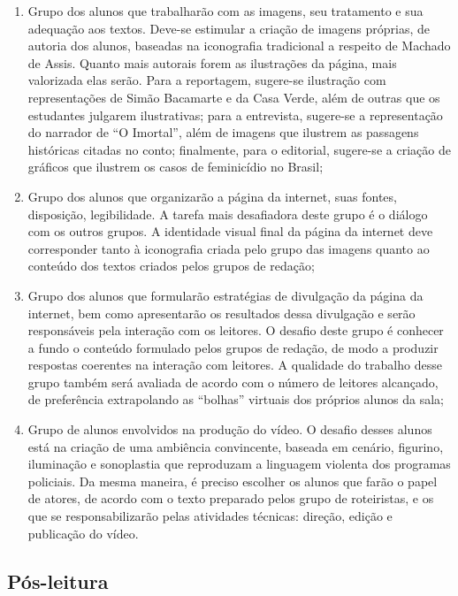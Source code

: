 \documentclass{extarticle}
\begin{document}
\begin{enumerate}
\item Grupo dos alunos que trabalharão com as imagens, seu tratamento e sua
adequação aos textos. Deve-se estimular a criação de imagens próprias,
de autoria dos alunos, baseadas na iconografia tradicional a respeito de
Machado de Assis. Quanto mais autorais forem as ilustrações da página,
mais valorizada elas serão. Para a reportagem, sugere-se ilustração com
representações de Simão Bacamarte e da Casa Verde, além de outras que os
estudantes julgarem ilustrativas; para a entrevista, sugere-se a
representação do narrador de ``O Imortal'', além de imagens que ilustrem
as passagens históricas citadas no conto; finalmente, para o editorial,
sugere-se a criação de gráficos que ilustrem os casos de feminicídio no
Brasil;

\item Grupo dos alunos que organizarão a página da internet, suas fontes,
disposição, legibilidade. A tarefa mais desafiadora deste grupo é o
diálogo com os outros grupos. A identidade visual final da página da
internet deve corresponder tanto à iconografia criada pelo grupo das
imagens quanto ao conteúdo dos textos criados pelos grupos de redação;

\item Grupo dos alunos que formularão estratégias de divulgação da página
da internet, bem como apresentarão os resultados dessa divulgação e
serão responsáveis pela interação com os leitores. O desafio deste grupo
é conhecer a fundo o conteúdo formulado pelos grupos de redação, de modo
a produzir respostas coerentes na interação com leitores. A qualidade do
trabalho desse grupo também será avaliada de acordo com o número de
leitores alcançado, de preferência extrapolando as ``bolhas'' virtuais
dos próprios alunos da sala;

\item Grupo de alunos envolvidos na produção do vídeo. O desafio desses
alunos está na criação de uma ambiência convincente, baseada em cenário,
figurino, iluminação e sonoplastia que reproduzam a linguagem violenta
dos programas policiais. Da mesma maneira, é preciso escolher os alunos
que farão o papel de atores, de acordo com o texto preparado pelos grupo
de roteiristas, e os que se responsabilizarão pelas atividades técnicas:
direção, edição e publicação do vídeo.
\end{enumerate}

\subsection{Pós-leitura}
\end{document}
